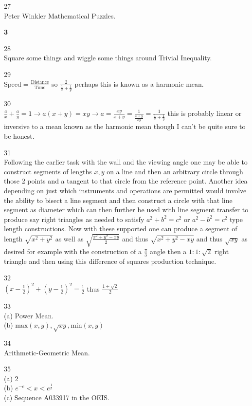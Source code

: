 27 \\
Peter Winkler Mathematical Puzzles.

\newpage

\textbf{3}

28 \\
Square some things and wiggle some things around Trivial Inequality.

29 \\
$\text{Speed}=\frac{\text{Distance}}{\text{Time}}$ so $\frac{2}{\frac{1}{x}+\frac{1}{y}}$ perhaps this is known as a harmonic mean.

30 \\
$\frac{a}{x}+\frac{a}{y}=1 \to a(x+y)=xy \to a=\boxed{\frac{xy}{x+y}}=\frac{1}{\frac{x+y}{xy}}=\frac{1}{\frac{1}{x}+\frac{1}{y}}$ this is probably linear or inversive to a mean known as the harmonic mean though I can't be quite sure to be honest.

31 \\
Following the earlier task with the wall and the viewing angle one may be able to construct segments of lengths $x,y$ on a line and then an arbitrary circle through those $2$ points and a tangent to that circle from the reference point. Another idea depending on just which instruments and operations are permitted would involve the ability to bisect a line segment and then construct a circle with that line segment as diameter which can then further be used with line segment transfer to produce say right triangles as needed to satisfy $a^2+b^2=c^2$ or $a^2-b^2=c^2$ type length constructions. Now with these supported one can produce a segment of length $\sqrt{x^2+y^2}$ as well as $\sqrt{\frac{x^2+y^2-xy}{2}}$ and thus $\sqrt{x^2+y^2-xy}$ and thus $\sqrt{xy}$ as desired for example with the construction of a $\frac{\pi}{3}$ angle then a $1:1:\sqrt{2}$ right triangle and then using this difference of squares production technique.

32 \\
$\left(x-\frac{1}{2} \right)^2+\left(y-\frac{1}{2} \right)^2=\frac{1}{2}$ thus $\boxed{\frac{1+\sqrt{2}}{2}}$

33 \\
(a) Power Mean. \\
(b) $\boxed{\text{max}(x,y),\sqrt{xy},\text{min}(x,y)}$

34 \\
Arithmetic-Geometric Mean.

35 \\
(a) $2$ \\
(b) $e^{-e} < x < e^{\frac{1}{e}}$ \\
(c) Sequence A033917 in the OEIS.


